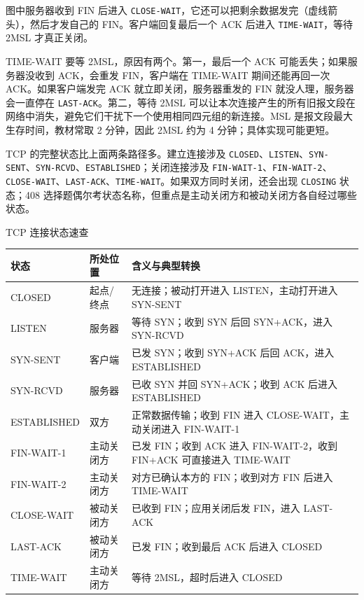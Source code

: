 图中服务器收到 FIN 后进入 \texttt{CLOSE-WAIT}，它还可以把剩余数据发完（虚线箭头），然后才发自己的 FIN。客户端回复最后一个 ACK 后进入 \texttt{TIME-WAIT}，等待 2MSL 才真正关闭。

TIME-WAIT 要等 2MSL，原因有两个。第一，最后一个 ACK 可能丢失；如果服务器没收到 ACK，会重发 FIN，客户端在 TIME-WAIT 期间还能再回一次 ACK。如果客户端发完 ACK 就立即关闭，服务器重发的 FIN 就没人理，服务器会一直停在 \texttt{LAST-ACK}。第二，等待 2MSL 可以让本次连接产生的所有旧报文段在网络中消失，避免它们干扰下一个使用相同四元组的新连接。MSL 是报文段最大生存时间，教材常取 2 分钟，因此 2MSL 约为 4 分钟；具体实现可能更短。

TCP 的完整状态比上面两条路径多。建立连接涉及 \texttt{CLOSED}、\texttt{LISTEN}、\texttt{SYN-SENT}、\texttt{SYN-RCVD}、\texttt{ESTABLISHED}；关闭连接涉及 \texttt{FIN-WAIT-1}、\texttt{FIN-WAIT-2}、\texttt{CLOSE-WAIT}、\texttt{LAST-ACK}、\texttt{TIME-WAIT}。如果双方同时关闭，还会出现 \texttt{CLOSING} 状态；408 选择题偶尔考状态名称，但重点是主动关闭方和被动关闭方各自经过哪些状态。

\begin{tablebox}{TCP 连接状态速查}
\centering
\small
\begin{tabularx}{\linewidth}{|l|l|X|}
\hline
状态 & 所处位置 & 含义与典型转换 \\
\hline
CLOSED & 起点/终点 & 无连接；被动打开进入 LISTEN，主动打开进入 SYN-SENT \\
LISTEN & 服务器 & 等待 SYN；收到 SYN 后回 SYN+ACK，进入 SYN-RCVD \\
SYN-SENT & 客户端 & 已发 SYN；收到 SYN+ACK 后回 ACK，进入 ESTABLISHED \\
SYN-RCVD & 服务器 & 已收 SYN 并回 SYN+ACK；收到 ACK 后进入 ESTABLISHED \\
ESTABLISHED & 双方 & 正常数据传输；收到 FIN 进入 CLOSE-WAIT，主动关闭进入 FIN-WAIT-1 \\
FIN-WAIT-1 & 主动关闭方 & 已发 FIN；收到 ACK 进入 FIN-WAIT-2，收到 FIN+ACK 可直接进入 TIME-WAIT \\
FIN-WAIT-2 & 主动关闭方 & 对方已确认本方的 FIN；收到对方 FIN 后进入 TIME-WAIT \\
CLOSE-WAIT & 被动关闭方 & 已收到 FIN；应用关闭后发 FIN，进入 LAST-ACK \\
LAST-ACK & 被动关闭方 & 已发 FIN；收到最后 ACK 后进入 CLOSED \\
TIME-WAIT & 主动关闭方 & 等待 2MSL，超时后进入 CLOSED \\
\hline
\end{tabularx}
\end{tablebox}

